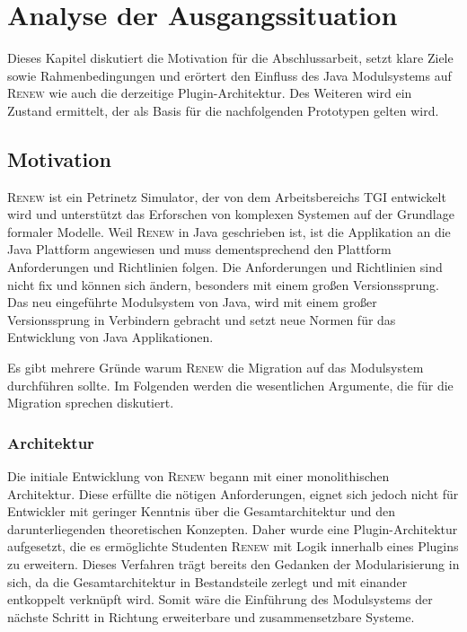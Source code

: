 \chapter{Analyse der Ausgangssituation}\label{cha:ausgangssituation}
	Dieses Kapitel diskutiert die Motivation für die Abschlussarbeit, setzt klare Ziele sowie Rahmenbedingungen und erörtert den Einfluss des Java Modulsystems auf \textsc{Renew} wie auch die derzeitige Plugin-Architektur. Des Weiteren wird ein Zustand ermittelt, der als Basis für die nachfolgenden Prototypen gelten wird.

\section{Motivation}\label{sec:motivation}
	\textsc{Renew} ist ein Petrinetz Simulator, der von dem Arbeitsbereichs TGI entwickelt wird und unterstützt das Erforschen von komplexen Systemen auf der Grundlage formaler Modelle.\newline
	Weil \textsc{Renew} in Java geschrieben ist, ist die Applikation an die Java Plattform angewiesen und muss dementsprechend den Plattform Anforderungen und Richtlinien folgen. Die Anforderungen und Richtlinien sind nicht fix und können sich ändern, besonders mit einem großen Versionssprung. Das neu eingeführte Modulsystem von Java, wird mit einem großer Versionssprung in Verbindern gebracht und setzt neue Normen für das Entwicklung von Java Applikationen. \bigbreak
	
	Es gibt mehrere Gründe warum \textsc{Renew} die Migration auf das Modulsystem durchführen sollte. Im Folgenden werden die wesentlichen Argumente, die für die Migration sprechen diskutiert.  

	\subsection{Architektur} \label{sub:architektur}
		Die initiale Entwicklung von \textsc{Renew} begann mit einer monolithischen Architektur. Diese erfüllte die nötigen Anforderungen, eignet sich jedoch nicht für Entwickler mit geringer Kenntnis über die Gesamtarchitektur und den darunterliegenden theoretischen Konzepten. Daher wurde eine Plugin-Architektur aufgesetzt, die es ermöglichte Studenten \textsc{Renew} mit Logik innerhalb eines Plugins zu erweitern. Dieses Verfahren trägt bereits den Gedanken der Modularisierung in sich, da die Gesamtarchitektur in Bestandsteile zerlegt und mit einander entkoppelt verknüpft wird. Somit wäre die Einführung des Modulsystems der nächste Schritt in Richtung erweiterbare und zusammensetzbare Systeme.

